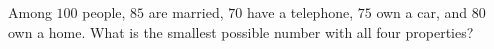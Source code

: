 Among $100$ people, $85$ are married, $70$ have a telephone, $75$ own a car, and $80$ own a home. What is the smallest possible number with all four properties?
